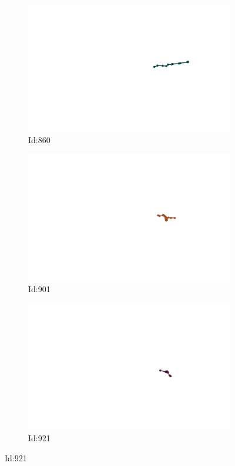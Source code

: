 \documentclass[12pt,twoside]{report}
\begin{document}
\begin{figure}
\begin{subfigure}[b]{0.20\textwidth}
\centering
\includegraphics[width=\textwidth]{../trajectories/860.png}
\caption{Id:860}
\end{subfigure}
\begin{subfigure}[b]{0.20\textwidth}
\centering
\includegraphics[width=\textwidth]{../trajectories/901.png}
\caption{Id:901}
\end{subfigure}
\begin{subfigure}[b]{0.20\textwidth}
\centering
\includegraphics[width=\textwidth]{../trajectories/921.png}
\caption{Id:921}
\end{subfigure}
\end{figure}
\end{document}
